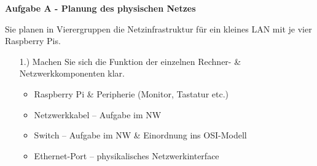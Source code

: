 \documentclass[paper=a4,fontsize=11pt]{scrartcl}%
\numberwithin{equation}{section}
\begin{document}
\begin{center}\Large{\textbf{Aufgabe A - Planung des physischen Netzes}}\end{center}\vskip0.25in
Sie planen in Vierergruppen die Netzinfrastruktur für ein kleines LAN mit je vier Rasp\-berry Pis.
\begin{itemize}
	\item[1.)] Machen Sie sich die Funktion der einzelnen Rechner- \& Netzwerkkomponenten klar.
\begin{itemize}
    \item Raspberry Pi \& Peripherie (Monitor, Tastatur etc.)
    \item Netzwerkkabel -- Aufgabe im NW
    \item Switch -- Aufgabe im NW \& Einordnung ins OSI-Modell
    \item Ethernet-Port -- physikalisches Netzwerkinterface
\end{itemize}
	

\end{itemize}
\end{document}
